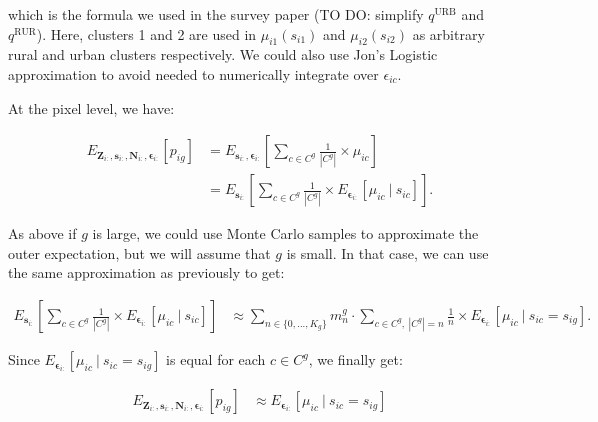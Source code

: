 \documentclass[12pt]{article}
\begin{document}
\noindent
which is the formula we used in the survey paper (TO DO: simplify $q^{\mathrm{URB}}$ and $q^{\mathrm{RUR}}$). Here, clusters 1 and 2 are used in $\mu_{i1}(s_{i1})$ and $\mu_{i2}(s_{i2})$ as arbitrary rural and urban clusters respectively. We could also use Jon's Logistic approximation to avoid needed to numerically integrate over $\epsilon_{ic}$.

At the pixel level, we have: 

\begin{align*}
E_{\boldsymbol{Z}_{i:}, \boldsymbol{s}_{i:}, \boldsymbol{N}_{i:}, \boldsymbol{ \epsilon }_{i:}} \left [p_{ig} \right ] &= E_{\boldsymbol{s}_{i:}, \boldsymbol{ \epsilon }_{i:}} \left [ \sum_{c \in C^g} \frac{1}{|C^g|}  \times  \mu_{ic} \right ] \\
&= E_{\boldsymbol{s}_{i:}} \left [ \sum_{c \in C^g} \frac{1}{|C^g|}  \times  E_{\boldsymbol{ \epsilon }_{i:}} \left [ \mu_{ic} \ \vert \ s_{ic} \right ] \right ].
\end{align*}

As above if $g$ is large, we could use Monte Carlo samples to approximate the outer expectation, but we will assume that $g$ is small. In that case, we can use the same approximation as previously to get: 

\begin{align*}
E_{\boldsymbol{s}_{i:}} \left [ \sum_{c \in C^g} \frac{1}{|C^g|}  \times  E_{\boldsymbol{ \epsilon }_{i:}} \left [ \mu_{ic} \ \vert \ s_{ic} \right ] \right ] &\approx \sum_{n \in \{0,...,K_g\}} m_n^g  \cdot \sum_{c \in C^g, \ |C^g|=n} \frac{1}{n}  \times  E_{\boldsymbol{ \epsilon }_{i:}} \left [ \mu_{ic} \ \vert \ s_{ic} = s_{ig} \right ].
\end{align*}

Since $E_{\boldsymbol{ \epsilon }_{i:}} \left [ \mu_{ic} \ \vert \ s_{ic} = s_{ig} \right ]$ is equal for each $c \in C^g$, we finally get:

\begin{align}
E_{\boldsymbol{Z}_{i:}, \boldsymbol{s}_{i:}, \boldsymbol{N}_{i:}, \boldsymbol{ \epsilon }_{i:}} \left [p_{ig} \right ] &\approx E_{\boldsymbol{ \epsilon }_{i:}} \left [ \mu_{ic} \ \vert \ s_{ic} = s_{ig} \right ] \label{eq:cpblPixel}
\end{align}
\end{document}
